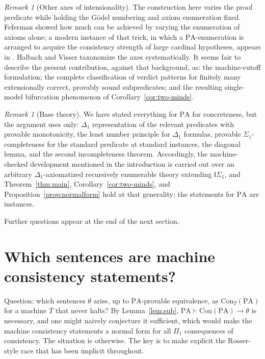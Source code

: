 \documentclass[11pt]{amsart}
\theoremstyle{definition}
\theoremstyle{remark}
\newtheorem{remark}[theorem]{Remark}
\newcommand{\PA}{\mathrm{PA}}
\newcommand{\Con}{\mathrm{Con}}
\begin{document}
\begin{remark}[Other axes of intensionality]\label{rem:axes}
The construction here varies the proof predicate while holding the
G\"odel numbering and axiom enumeration fixed. Feferman
\cite{Feferman1960} showed how much can be achieved by varying the
enumeration of axioms alone; a modern instance of that trick, in which a
$\PA$-enumeration is arranged to acquire the consistency strength of
large cardinal hypotheses, appears in \cite{Hamkins2022qeios}. Halbach
and Visser \cite{HalbachVisser2014a,HalbachVisser2014b} taxonomize the
axes systematically. It seems fair to describe the present contribution,
against that background, as: the machine-cutoff formulation; the
complete classification of verdict patterns for finitely many
extensionally correct, provably sound subpredicates; and the resulting
single-model bifurcation phenomenon of
Corollary~\ref{cor:two-minds}.
\end{remark}

\begin{remark}[Base theory]\label{rem:base-theory}
We have stated everything for $\PA$ for concreteness, but the argument
uses only: $\Delta_1$ representation of the relevant predicates with
provable monotonicity, the least number principle for $\Delta_1$
formulas, provable $\Sigma_1$-completeness for the standard predicate at
standard instances, the diagonal lemma, and the second incompleteness
theorem. Accordingly, the machine-checked development mentioned in the
introduction is carried out over an arbitrary $\Delta_1$-axiomatized
recursively enumerable theory extending $\mathsf{I}\Sigma_1$, and
Theorem~\ref{thm:main}, Corollary~\ref{cor:two-minds}, and
Proposition~\ref{prop:normalform} hold at that generality; the
statements for $\PA$ are instances.
\end{remark}

Further questions appear at the end of the next section.

\section{Which sentences are machine consistency statements?}
\label{sec:which}

Question: which sentences $\theta$ arise, up to $\PA$-provable
equivalence, as $\Con_T(\PA)$ for a machine $T$ that never halts? By
Lemma~\ref{lem:sub}, $\PA\vdash\Con(\PA)\to\theta$ is necessary, and one
might naively conjecture it sufficient, which would make the machine
consistency statements a normal form for all $\Pi_1$ consequences of
consistency. The situation is otherwise. The key is to make explicit the Rosser-style race that has
been implicit throughout.
\end{document}
